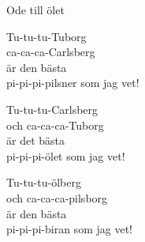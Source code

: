 \begin{song}{Ode till ölet}

    
	
	\begin{repetition}
	Tu-tu-tu-Tuborg\\
	ca-ca-ca-Carlsberg\\
	är den bästa\\
	pi-pi-pi-pilsner som jag vet!
	\end{repetition}
	
	\begin{repetition}
	Tu-tu-tu-Carlsberg\\
	och ca-ca-ca-Tuborg\\
	är det bästa\\
	pi-pi-pi-ölet som jag vet!
	\end{repetition}
	
	\begin{repetition}
	Tu-tu-tu-ölberg\\
	och ca-ca-ca-pilsborg\\
	är den bästa\\
	pi-pi-pi-biran som jag vet!
	\end{repetition}
	
\end{song}
